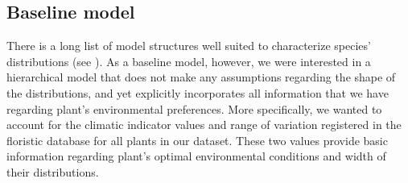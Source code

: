 \documentclass[11pt, a4paper]{article}
\begin{document}


\subsection*{Baseline model}
There is a long list of model structures well suited to characterize species' distributions (see \citealt{norbergComprehensiveEvaluationPredictive2019}). As a baseline model, however, we were interested in a hierarchical model that does not make any assumptions regarding the shape of the distributions, and yet explicitly incorporates all information that we have regarding plant's environmental preferences. More specifically, we wanted to account for the climatic indicator values and range of variation registered in the floristic database for all plants in our dataset. These two values provide basic information regarding plant's optimal environmental conditions and width of their distributions.
\end{document}
